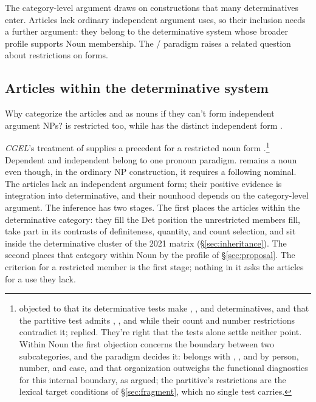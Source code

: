 \documentclass[12pt]{article}
\begin{document}
The category-level argument draws on constructions that many determinatives enter. Articles lack ordinary independent argument uses, so their inclusion needs a further argument: they belong to the determinative system whose broader profile supports Noun membership. The / paradigm raises a related question about restrictions on forms.

\subsection{Articles within the determinative system}\label{sec:article-membership}

Why categorize the articles  and  as nouns if they can't form independent argument NPs?  is restricted too, while  has the distinct independent form  \citep[371--372, 410--411]{huddleston2002}.

\textit{CGEL}'s treatment of  supplies a precedent for a restricted noun form \citep[470--471]{huddleston2002}.\footnote{\textcite{lenchukahmed2014determinatives} objected to \textcite{reynolds2013determiners} that its determinative tests make , , and  determinatives, and that the partitive test admits , , and  while their count and number restrictions contradict it; \textcite{reynolds2014determinatives} replied. They're right that the tests alone settle neither point. Within Noun the first objection concerns the boundary between two subcategories, and the paradigm decides it:  belongs with , , and  by person, number, and case, and that organization outweighs the functional diagnostics for this internal boundary, as \textcite{reynolds2014determinatives} argued; the partitive's restrictions are the lexical target conditions of §\ref{sec:fragment}, which no single test carries.} Dependent  and independent  belong to one pronoun paradigm.  remains a noun even though, in the ordinary NP construction, it requires a following nominal. The articles lack an independent argument form; their positive evidence is integration into determinative, and their nounhood depends on the category-level argument. The inference has two stages. The first places the articles within the determinative category: they fill the Det position the unrestricted members fill, take part in its contrasts of definiteness, quantity, and count selection, and sit inside the determinative cluster of the 2021 matrix (§\ref{sec:inheritance}). The second places that category within Noun by the profile of §\ref{sec:proposal}. The criterion for a restricted member is the first stage; nothing in it asks the articles for a use they lack.
\end{document}

